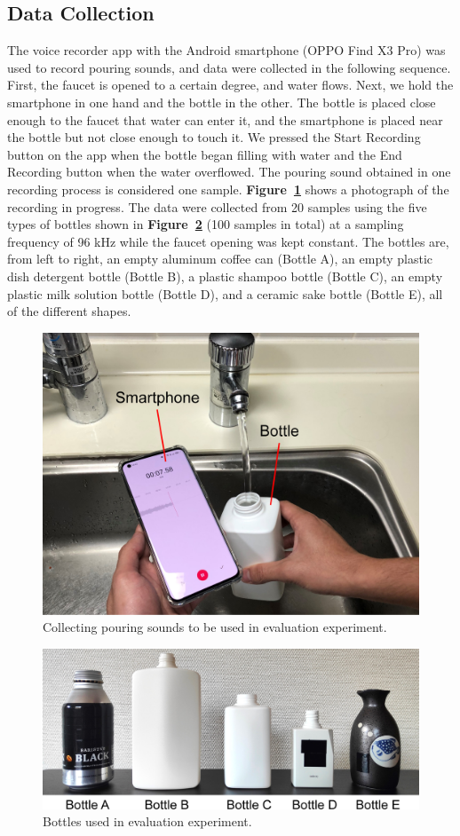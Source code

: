 \documentclass[sigconf,authordraft]{acmart}
\newcommand\figref[1]{\textbf{Figure~\ref{fig:#1}}}
\begin{document}
\subsection{Data Collection}
The voice recorder app with the Android smartphone (OPPO Find X3 Pro) was used to record pouring sounds, and data were collected in the following sequence. First, the faucet is opened to a certain degree, and water flows. Next, we hold the smartphone in one hand and the bottle in the other. The bottle is placed close enough to the faucet that water can enter it, and the smartphone is placed near the bottle but not close enough to touch it. We pressed the Start Recording button on the app when the bottle began filling with water and the End Recording button when the water overflowed. The pouring sound obtained in one recording process is considered one sample. \figref{data_acquisition} shows a photograph of the recording in progress. The data were collected from 20 samples using the five types of bottles shown in \figref{bottles} (100 samples in total) at a sampling frequency of 96 kHz while the faucet opening was kept constant. The bottles are, from left to right, an empty aluminum coffee can (Bottle A), an empty plastic dish detergent bottle (Bottle B), a plastic shampoo bottle (Bottle C), an empty plastic milk solution bottle (Bottle D), and a ceramic sake bottle (Bottle E), all of the different shapes.

\begin{figure}[!t]
  \centering
  \includegraphics[width=0.5\linewidth]{figures/data_acquisition.eps}
  \caption{Collecting pouring sounds to be used in evaluation experiment.}
  \label{fig:data_acquisition}
\end{figure}

\begin{figure}[!t]
  \centering
  \includegraphics[width=0.5\linewidth]{figures/bottles.eps}
  \caption{Bottles used in evaluation experiment.}
  \label{fig:bottles}
\end{figure}
\end{document}
